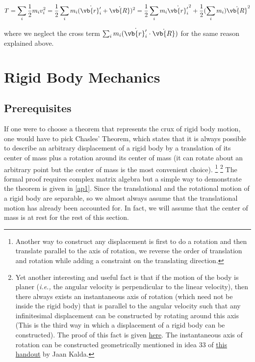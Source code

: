 \documentclass[a4paper,12pt]{report}
\begin{document}
\begin{equation}
	T = \sum_{i}^{} \frac{1}{2} m_{i} v_{i} ^2 = \frac{1}{2}  \sum_{i}^{}  m_{i} (\dot{\vb{r} '_{i} } + \dot{\vb{R} } )^2 = \frac{1}{2} \sum_{i}^{} m_{i} \dot{\vb{r} '_{i} } ^2 + \frac{1}{2} (\sum_{i}^{} m_{i} ) \dot{\vb{R} } ^2  \label{T1}   
\end{equation}

where we neglect the cross term \(\sum_{i}^{} m_{i} (\dot{\vb{r} '_{i} } \cdot \dot{\vb{R} })  \) for the same reason explained above. 




\newpage
\section{Rigid Body Mechanics}
\subsection{Prerequisites}
If one were to choose a theorem that represents the crux of rigid body motion, one would have to pick Chasles' Theorem, which states that it is always possible to describe an arbitrary displacement of a rigid body by a translation of its center of mass plus a rotation around its center of mass (it can rotate about an arbitrary point but the center of mass is the most convenient choice). \footnote{Another way to construct any displacement is first to do a rotation and then translate parallel to the axis of rotation, we reverse the order of translation and rotation while adding a constraint on the translating direction.} \footnote{Yet another interesting and useful fact is that if the motion of the body is planer (\textit{i.e.,} the angular velocity is perpendicular to the linear velocity), then there always exists an instantaneous axis of rotation (which need not be inside the rigid body) that is parallel to the angular velocity such that any infinitesimal displacement can be constructed by rotating around this axis (This is the third way in which a displacement of a rigid body can be constructed). The proof of this fact is given \href{https://physics.stackexchange.com/q/541554}{here}. The instantaneous axis of rotation can be constructed geometrically mentioned in idea 33 of \href{https://www.ioc.ee/~kalda/ipho/kin_ENG.pdf}{this handout} by Jaan Kalda.}  The formal proof requires complex matrix algebra but a simple way to demonstrate the theorem is given in \cref{ap1}. Since the translational and the rotational motion of a rigid body are separable, so we almost always assume that the translational motion has already been accounted for. In fact, we will assume that the center of mass is at rest for the rest of this section.
\end{document}

